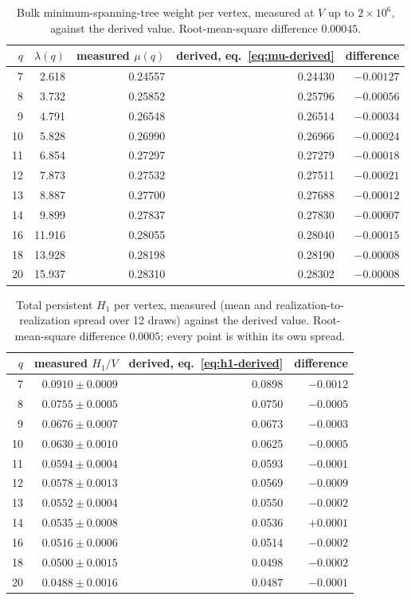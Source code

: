 \documentclass[11pt]{article}
\begin{document}
\begin{table}[htbp]
\centering
\begin{tabular}{rrrrr}
\toprule
$q$ & $\lambda(q)$ & measured $\mu(q)$ & derived, eq.~\eqref{eq:mu-derived} & difference \\
\midrule
7 & 2.618 & 0.24557 & 0.24430 & $-0.00127$ \\
8 & 3.732 & 0.25852 & 0.25796 & $-0.00056$ \\
9 & 4.791 & 0.26548 & 0.26514 & $-0.00034$ \\
10 & 5.828 & 0.26990 & 0.26966 & $-0.00024$ \\
11 & 6.854 & 0.27297 & 0.27279 & $-0.00018$ \\
12 & 7.873 & 0.27532 & 0.27511 & $-0.00021$ \\
13 & 8.887 & 0.27700 & 0.27688 & $-0.00012$ \\
14 & 9.899 & 0.27837 & 0.27830 & $-0.00007$ \\
16 & 11.916 & 0.28055 & 0.28040 & $-0.00015$ \\
18 & 13.928 & 0.28198 & 0.28190 & $-0.00008$ \\
20 & 15.937 & 0.28310 & 0.28302 & $-0.00008$ \\
\bottomrule
\end{tabular}
\caption{Bulk minimum-spanning-tree weight per vertex, measured at $V$ up to $2\times10^6$, against the derived value. Root-mean-square difference $0.00045$.}
\label{tab:mu}
\end{table}

\begin{table}[htbp]
\centering
\begin{tabular}{rrrr}
\toprule
$q$ & measured $H_1/V$ & derived, eq.~\eqref{eq:h1-derived} & difference \\
\midrule
7 & $0.0910\pm0.0009$ & 0.0898 & $-0.0012$ \\
8 & $0.0755\pm0.0005$ & 0.0750 & $-0.0005$ \\
9 & $0.0676\pm0.0007$ & 0.0673 & $-0.0003$ \\
10 & $0.0630\pm0.0010$ & 0.0625 & $-0.0005$ \\
11 & $0.0594\pm0.0004$ & 0.0593 & $-0.0001$ \\
12 & $0.0578\pm0.0013$ & 0.0569 & $-0.0009$ \\
13 & $0.0552\pm0.0004$ & 0.0550 & $-0.0002$ \\
14 & $0.0535\pm0.0008$ & 0.0536 & $+0.0001$ \\
16 & $0.0516\pm0.0006$ & 0.0514 & $-0.0002$ \\
18 & $0.0500\pm0.0015$ & 0.0498 & $-0.0002$ \\
20 & $0.0488\pm0.0016$ & 0.0487 & $-0.0001$ \\
\bottomrule
\end{tabular}
\caption{Total persistent $H_1$ per vertex, measured (mean and realization-to-realization spread over 12 draws) against the derived value. Root-mean-square difference $0.0005$; every point is within its own spread.}
\label{tab:h1}
\end{table}
\end{document}
